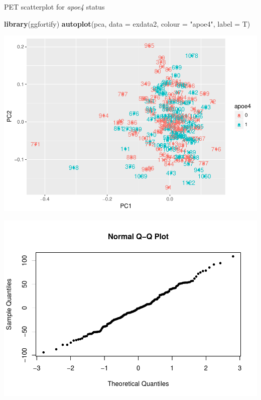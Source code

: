\documentclass[]{article}
\newenvironment{Shaded}{\begin{snugshade}}{\end{snugshade}}
\newcommand{\KeywordTok}[1]{\textcolor[rgb]{0.13,0.29,0.53}{\textbf{#1}}}
\newcommand{\DataTypeTok}[1]{\textcolor[rgb]{0.13,0.29,0.53}{#1}}
\newcommand{\DecValTok}[1]{\textcolor[rgb]{0.00,0.00,0.81}{#1}}
\newcommand{\StringTok}[1]{\textcolor[rgb]{0.31,0.60,0.02}{#1}}
\newcommand{\OperatorTok}[1]{\textcolor[rgb]{0.81,0.36,0.00}{\textbf{#1}}}
\newcommand{\NormalTok}[1]{#1}
\begin{document}
PET scatterplot for \emph{apoe4} status

\begin{Shaded}
\begin{Highlighting}[]
\KeywordTok{library}\NormalTok{(ggfortify)}
\KeywordTok{autoplot}\NormalTok{(pca, }\DataTypeTok{data =}\NormalTok{ exdata2, }\DataTypeTok{colour =} \StringTok{"apoe4"}\NormalTok{, }\DataTypeTok{label =}\NormalTok{ T)}
\end{Highlighting}
\end{Shaded}

\includegraphics{20180125_summary_to_date_files/figure-latex/unnamed-chunk-69-1.pdf}

\begin{Shaded}
\end{Shaded}

\includegraphics{20180125_summary_to_date_files/figure-latex/unnamed-chunk-70-1.pdf}
\end{document}

